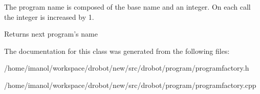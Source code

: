 The program name is composed of the base name and an integer. On each call the integer is increased by 1. \begin{DoxyReturn}{Returns}
next program's name 
\end{DoxyReturn}


The documentation for this class was generated from the following files\-:\begin{DoxyCompactItemize}
\item 
/home/imanol/workspace/drobot/new/src/drobot/program/programfactory.\-h\item 
/home/imanol/workspace/drobot/new/src/drobot/program/programfactory.\-cpp\end{DoxyCompactItemize}
